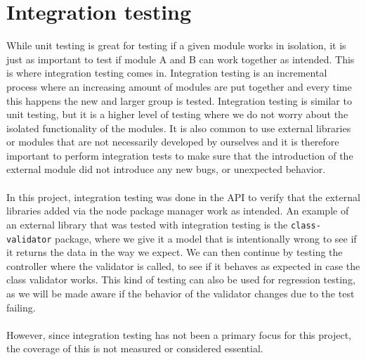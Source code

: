 \section{Integration testing}\label{sec:integrationTesting}
While unit testing is great for testing if a given module works in isolation, it is just as important to test if module A and B can work together as intended.
This is where integration testing comes in. 
Integration testing is an incremental process where an increasing amount of modules are put together and every time this happens the new and larger group is tested.
Integration testing is similar to unit testing, but it is a higher level of testing where we do not worry about the isolated functionality of the modules.
It is also common to use external libraries or modules that are not necessarily developed by ourselves and it is therefore important to perform integration tests to make sure that the introduction of the external module did not introduce any new bugs, or unexpected behavior.  
\\\\
In this project, integration testing was done in the API to verify that the external libraries added via the node package manager work as intended.
An example of an external library that was tested with integration testing is the \texttt{class-validator} package, where we give it a model that is intentionally wrong to see if it returns the data in the way we expect.
We can then continue by testing the controller where the validator is called, to see if it behaves as expected in case the class validator works.
This kind of testing can also be used for regression testing, as we will be made aware if the behavior of the validator changes due to the test failing.
\\\\
However, since integration testing has not been a primary focus for this project, the coverage of this is not measured or considered essential.